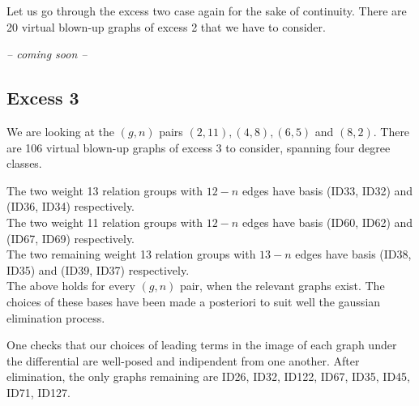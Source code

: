 Let us go through the excess two case again for the sake of continuity. There are 20 virtual blown-up graphs of excess 2 that we have to consider.

\textit{-- coming soon --}





\subsection{Excess 3} We are looking at the $(g,n)$ pairs $(2,11),(4,8),(6,5)$ and $(8,2)$.
There are 106 virtual blown-up graphs of excess 3 to consider, spanning four degree classes.

The two weight 13 relation groups with $12-n$ edges have basis (ID33, ID32) and (ID36, ID34) respectively.\\
The two weight 11 relation groups with $12-n$ edges have basis (ID60, ID62) and (ID67, ID69) respectively.\\
The two remaining weight 13 relation groups with $13-n$ edges have basis (ID38, ID35) and (ID39, ID37) respectively.\\
The above holds for every $(g,n)$ pair, when the relevant graphs exist. The choices of these bases have been made a posteriori to suit well the gaussian elimination process.

One checks that our choices of leading terms in the image of each graph under the differential are well-posed and indipendent from one another. After elimination, the only graphs remaining are ID26, ID32, ID122, ID67, ID35, ID45, ID71, ID127.

